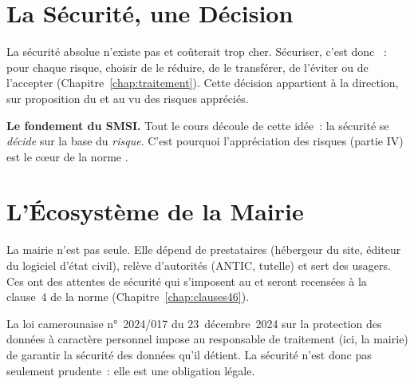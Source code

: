 \section{La Sécurité, une Décision}
\label{sec:c02-decision}

La sécurité absolue n'existe pas et coûterait trop cher. Sécuriser, c'est
donc ~: pour chaque risque, choisir de le réduire, de le
transférer, de l'éviter ou de l'accepter (Chapitre~\ref{chap:traitement}).
Cette décision appartient à la direction, sur proposition du  et au
vu des risques appréciés.

\begin{boxinfo}
\textbf{Le fondement du SMSI.} Tout le cours découle de cette idée~: la
sécurité se \emph{décide} sur la base du \emph{risque}. C'est pourquoi
l'appréciation des risques (partie IV) est le cœur de la norme
.
\end{boxinfo}

\section{L'Écosystème de la Mairie}
\label{sec:c02-ecosysteme}

La mairie n'est pas seule. Elle dépend de prestataires (hébergeur du site,
éditeur du logiciel d'état civil), relève d'autorités (ANTIC, tutelle) et sert
des usagers. Ces  ont des attentes de sécurité
qui s'imposent au  et seront recensées à la clause~4 de la norme
(Chapitre~\ref{chap:clauses46}).

\begin{boxjuris}
La loi camerounaise n°~2024/017 du 23~décembre~2024 sur la protection des
données à caractère personnel impose au responsable de traitement (ici, la
mairie) de garantir la sécurité des données qu'il détient. La sécurité n'est
donc pas seulement prudente~: elle est une obligation légale.
\end{boxjuris}

\separateur

